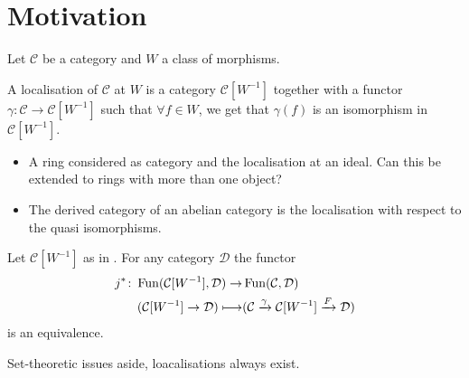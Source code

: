 \section{Motivation}

Let $\mathcal{C}$ be a category and $W$ a class of morphisms.

\begin{defi}
\label{localisation_morphisms}
    A localisation of $\mathcal{C}$ at $W$ is a category $\mathcal{C}[W^{-1}]$ together with a functor $\gamma\colon \mathcal{C} \to \mathcal{C}[W^{-1}]$ such that $\forall f \in W$, we get that $\gamma(f)$ is an isomorphism in $\mathcal{C}[W^{-1}]$.
\end{defi}

\begin{exmp}
    \begin{itemize}
        \item 
        A ring considered as category and the localisation at an ideal.
        Can this be extended to rings with more than one object?
        \item 
        The derived category of an abelian category is the localisation with respect to the quasi isomorphisms.
    \end{itemize}
\end{exmp}

\begin{prop}
    Let $\mathcal{C}[W^{-1}]$ as in . 
    For any category $\mathcal{D}$ the functor 
        \begin{align*}
            j^*\colon\operatorname{Fun}(\mathcal{C}[W^{-1}], \mathcal{D}) 
            \to
            &
            \operatorname{Fun}(\mathcal{C},\mathcal{D})
            \\
            (\mathcal{C}[W^{-1}] \to 
            \mathcal{D})\longmapsto
            &
            (\mathcal{C} \xrightarrow{\gamma}
            \mathcal{C}[W^{-1}]
            \xrightarrow{F}
            \mathcal{D})
        \end{align*}
    is an equivalence.
\end{prop}

\begin{thm}%
    Set-theoretic issues aside, loacalisations always exist. 
\end{thm}
    

